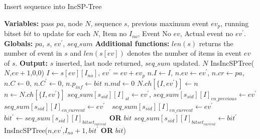 \begin{algorithm}[!t]
    \small %
    \caption{Insert sequence into IncSP-Tree}\label{algorithm:insert}
    \begin{algorithmic}[1]
        \State \textbf{Variables: }pass $pa$, node $N$, sequence $s$, previous maximum event $ev_{p}$, running bitset $bit$ to update for each $N$, Item no $I_{no}$, Event No $ev$, Actual event no $ev^{\prime}$.
        \State \textbf{Globals: }$pa$, $s$, $ev^{\prime}$, $seq\_sum$
        \State \textbf{Additional functions: }$len(s)$ returns the number of event in $s$ and $len(s[ev])$ denotes the number of items in event $ev$ of $s$.
        \State \textbf{Output: }$s$ inserted, last node returned, $seq\_sum$ updated. 
             
                \State  {}$N$
            \EndIf 
             
                \State {}
                \State {} InsIncSPTree($N$,$ev+1$,0,0) 
            \EndIf
            \State $I \gets s[ev][I_{no}]$, $ev^{\prime}=ev+ev_{p}$
             
                \State {}
                \State $n.I \gets I$, $n.ev \gets ev^{\prime}$, $n.cr \gets pa$, $n.C \gets 0$, $n.C^{\prime} \gets 0$, $n.p_{inf} \gets bit$
                \State $n.md \gets 0$  
                \State $N.ch[\{I,ev^{\prime}\}] \gets n$ 
            \EndIf
            \State $n\gets N.ch[\{I,ev^{\prime}\}]$
            \State {}            
            \State $seq\_sum[s_{sid}][I]_{st} \gets ev^{\prime}$, 
            \State $seq\_sum[s_{sid}][I]_{en\_previous} \gets ev^{\prime}$
                \State $seq\_sum[s_{sid}][I]_{en\_current} \gets  ev^{\prime}$ 
            \Else  {}
            \State $\text{ }seq\_sum[s_{sid}][I]_{en\_current}\gets ev^{\prime}$ 
            \EndIf
            \State {}
            \State $bit^{\prime} \gets seq\_sum[s_{sid}][I]_{bitset_{current}}$\textbf{ OR }$bit$ 
            \State $seq\_sum[s_{sid}][I]_{bitset_{current}}\gets bit^{\prime}$ 
            \State {} InsIncSPTree($n$,$ev^{\prime}$,$I_{no}+1,bit^{\prime}$\textbf{ OR }$bit$)
                \State {}
        \EndProcedure
    \end{algorithmic}
\end{algorithm}


